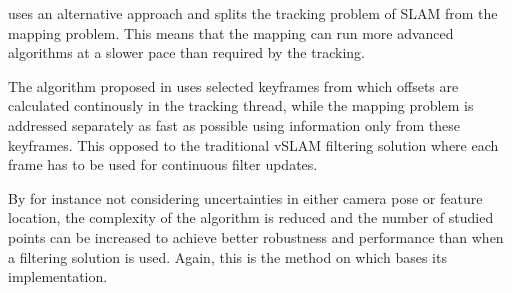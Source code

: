     \citep{klein07parallel} uses an alternative approach and splits the tracking problem of SLAM from the mapping problem.
    This means that the mapping can run more advanced algorithms at a slower
    pace than required by the tracking.

    The algorithm proposed in \citep{klein07parallel} uses selected keyframes
    from which offsets are calculated continously in the tracking thread, while
    the mapping problem is addressed separately as fast as possible using information only
    from these keyframes. This opposed to the traditional vSLAM filtering
    solution where each frame has to be used for continuous filter updates.

    By for instance not considering uncertainties in either camera pose or feature location,
    the complexity of the algorithm is reduced and the number of studied points
    can be increased to achieve better robustness and
    performance\citep{DBLP:conf/icra/StrasdatMD10} than when a filtering solution is used.
    Again, this is the method on which \citep{weiss11monocular} bases its implementation.
